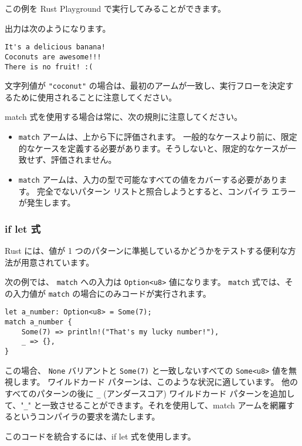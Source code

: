 この例を Rust Playground で実行してみることができます。

出力は次のようになります。

\begin{lstlisting}[numbers=none]
It's a delicious banana!
Coconuts are awesome!!!
There is no fruit! :(
\end{lstlisting}

文字列値が \texttt{"coconut"} の場合は、最初のアームが一致し、実行フローを決定するために使用されることに注意してください。

match 式を使用する場合は常に、次の規則に注意してください。

\begin{itemize}
\item \texttt{match} アームは、上から下に評価されます。 一般的なケースより前に、限定的なケースを定義する必要があります。そうしないと、限定的なケースが一致せず、評価されません。
\item \texttt{match} アームは、入力の型で可能なすべての値をカバーする必要があります。 完全でないパターン リストと照合しようとすると、コンパイラ エラーが発生します。
\end{itemize}

\subsubsection{if let 式}

Rust には、値が 1 つのパターンに準拠しているかどうかをテストする便利な方法が用意されています。

次の例では、 \texttt{match} への入力は \texttt{Option<u8>} 値になります。 \texttt{match} 式では、その入力値が \texttt{match} の場合にのみコードが実行されます。

\begin{lstlisting}[numbers=none]
let a_number: Option<u8> = Some(7);
match a_number {
    Some(7) => println!("That's my lucky number!"),
    _ => {},
}
\end{lstlisting}

この場合、 \texttt{None} バリアントと \texttt{Some(7)} と一致しないすべての \texttt{Some<u8>} 値を無視します。 ワイルドカード パターンは、このような状況に適しています。 他のすべてのパターンの後に \texttt{\_} (アンダースコア) ワイルドカード パターンを追加して、"\texttt{\_}" と一致させることができます。それを使用して、match アームを網羅するというコンパイラの要求を満たします。

このコードを統合するには、if let 式を使用します。

